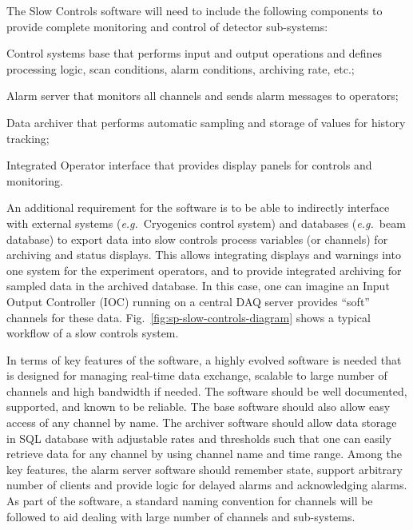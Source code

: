 
The Slow Controls software will need to include the following components
to provide complete monitoring and control of detector sub-systems:
%
\begin{description}
 \item{Control systems base} that performs input and output operations
  and defines processing logic, scan conditions, alarm conditions,
  archiving rate, etc.;
 \item{Alarm server} that monitors all channels and sends alarm
  messages to operators; 
 \item{Data archiver} that performs automatic sampling and storage of
  values for history tracking;
 \item{Integrated Operator interface} that provides display panels for
  controls and monitoring.
\end{description}

An additional requirement for the software is to be able to indirectly
interface with external systems ({\em e.g.}\ Cryogenics control
system) and databases ({\em e.g.}\ beam database) to export data into
slow controls process variables (or channels) for archiving and status
displays. This allows integrating displays and warnings into one
system for the experiment operators, and to provide integrated
archiving for sampled data in the archived database. In this case, one
can imagine an Input Output Controller (IOC) running on a central DAQ
server provides ``soft'' channels for these data.
Fig.\ \ref{fig:sp-slow-controls-diagram} shows a typical workflow of a
slow controls system.

In terms of key features of the software, a highly evolved software is
needed that is designed for managing real-time data exchange, scalable
to large number of channels and high bandwidth if needed. The software
should be well documented, supported, and known to be reliable. The base
software should also allow easy access of any channel by name. The
archiver software should allow data storage in SQL database with
adjustable rates and thresholds such that one can easily retrieve data
for any channel by using channel name and time range. Among the key
features, the alarm server software should remember state, support
arbitrary number of clients and provide logic for delayed alarms and
acknowledging alarms. As part of the software, a standard naming
convention for channels will be followed to aid dealing with large
number of channels and sub-systems.



